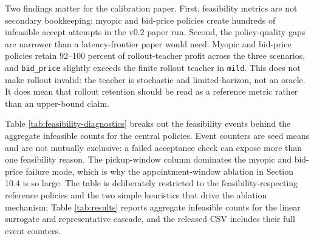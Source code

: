 \documentclass[11pt]{article}
\begin{document}
Two findings matter for the calibration paper. First, feasibility metrics are
not secondary bookkeeping: myopic and bid-price policies create hundreds of
infeasible accept attempts in the v0.2 paper run. Second, the policy-quality
gaps are narrower than a latency-frontier paper would need. Myopic and
bid-price policies retain 92--100 percent of rollout-teacher profit across the
three scenarios, and \texttt{bid\_price} slightly exceeds the finite rollout
teacher in \texttt{mild}. This does not make rollout invalid: the teacher is
stochastic and limited-horizon, not an oracle. It does mean that rollout
retention should be read as a reference metric rather than an upper-bound
claim.

Table \ref{tab:feasibility-diagnostics} breaks out the feasibility events
behind the aggregate infeasible counts for the central policies. Event
counters are seed means and are not mutually exclusive: a failed acceptance
check can expose more than one feasibility reason. The pickup-window column
dominates the myopic and bid-price failure mode, which is why the
appointment-window ablation in Section 10.4 is so large. The table is
deliberately restricted to the feasibility-respecting reference policies and
the two simple heuristics that drive the ablation mechanism; Table
\ref{tab:results} reports aggregate infeasible counts for the linear surrogate
and representative cascade, and the released CSV includes their full event
counters.
\end{document}
